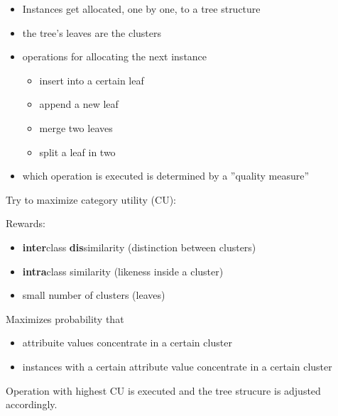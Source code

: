 \begin{breakbox}

\begin{itemize}
	\item Instances get allocated, one by one, to a tree structure
	\item the tree's leaves are the clusters
	\item operations for allocating the next instance
		\begin{itemize}
			\item insert into a certain leaf
			\item append a new leaf
			\item merge two leaves
			\item split a leaf in two
		\end{itemize}
	\item which operation is executed is determined by a ''quality measure''
\end{itemize}

Try to maximize category utility (CU):

Rewards:
\begin{itemize}
	\item \textbf{inter}class \textbf{dis}similarity (distinction between clusters)
	\item \textbf{intra}class similarity (likeness inside a cluster)
	\item small number of clusters (leaves)
\end{itemize}

Maximizes probability that
\begin{itemize}
	\item attribuite values concentrate in a certain cluster
	\item instances with a certain attribute value concentrate in a certain cluster
\end{itemize}

Operation with highest CU is executed and the tree strucure is adjusted accordingly.

\end{breakbox}

